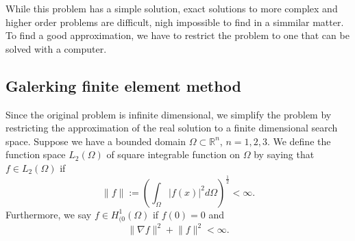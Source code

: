 \documentclass[a4paper]{article}
\newcommand{\Reals}{\mathbb{R}}
\newcommand{\LO}{\ensuremath{L_2(\Omega)}}
\newcommand{\HOzero}{\ensuremath{H^1_{(0}(\Omega)}}
\begin{document}
While this problem has a simple solution, exact solutions to more
complex and higher order problems are difficult, nigh impossible to
find in a simmilar matter. To find a good approximation, we have to
restrict the problem to one that can be solved with a computer.

\subsection{Galerking finite element method}

Since the original problem is infinite dimensional, we simplify the
problem by restricting the approximation of the real solution to a
finite dimensional search space. Suppose we have a bounded domain
$\Omega \subset \Reals^n$, $n = 1, 2, 3$.  We define the function
space $\LO$ of square integrable function on $\Omega$ by saying that
$f \in \LO$ if
\begin{equation}
  \lVert f \rVert := \left(
    \int_\Omega | f(x) |^2 d\Omega \right)^{\frac{1}{2}} < \infty.
\end{equation}
Furthermore, we say $f \in \HOzero$ if $f(0) = 0$ and
\begin{equation}
  \lVert \nabla f \rVert^2 + \lVert f \rVert^2 < \infty.
\end{equation}
\end{document}
